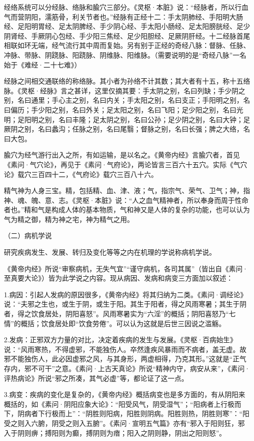 \documentclass[12pt,UTF8]{ctexbook}
\begin{document}
经络系统可以分经脉、络脉和腧穴三部分。《灵枢·本脏》说：“经脉者，所以行血气而营阴阳，濡筋骨，利关节者也。”经脉有正经十二：手太阴肺经、手阳明大肠经、足阳明胃经、足太阴脾经、手少阴心经、手太阳小肠经、足太阳膀胱经、足少阴肾经、手厥阴心包经、手少阳三焦经、足少阳胆经、足厥阴肝经。十二经脉首尾相联如环无端，经气流行其中周而复始。另有别于正经的奇经八脉：督脉、任脉、冲脉、带脉、阴跷脉、阳跷脉、阴维脉、阳维脉。（需要说明的是“奇经八脉”一名始于《难经·二十七难》）

经脉之间相交通联络的称络脉。其小者为孙络不计其数；其大者有十五，称十五络脉。《灵枢·经脉》言之甚详，这里仅摘其要：手太阴之别，名曰列缺；手少阴之别，名曰通里；手心主之别，名曰内关；手太阳之别，名曰支正；手阳明之别，名曰偏历；手少阳之别，名曰外关；足太阳之别，名曰飞阳；足少阳之别，名曰光明；足阳明之别，名曰丰隆；足太阴之别，名曰公孙；足少阴之别，名曰大钟；足厥阴之别，名曰蠡沟；任脉之别，名曰尾翳；督脉之别，名曰长强；脾之大络，名曰大包。

腧穴为经气游行出入之所，有如运输，是以名之。《黄帝内经》言腧穴者，首见《素问·气穴论》，再见于《素问·气府论》，两论皆言三百六十五穴。实际《气穴论》载穴三百四十二，《气府论》载穴三百八十六。

精气神为人身三宝。精，包括精、血、津、液；气，指宗气、荣气、卫气；神，指神、魂、魄、意、志。《灵枢·本脏》说：“人之血气精神者，所以奉身而周于性命者也。”精和气是构成人体的基本物质，气和神又是人体的复杂的功能，也可以认为气为精之御，精为神之宅，神为精气之用。

（二）病机学说

研究疾病发生、发展、转归及变化等等之内在机理的学说称病机学说。

《黄帝内经》所说“审察病机，无失气宜”“谨守病机，各司其属”（皆出自《素问·至真要大论》）皆为此学说之内容。现从病因、发病和病变三方面加以叙述：

1.病因：引起人发病的原因很多，《黄帝内经》将其归纳为二类。《素问·调经论》说：“夫邪之生也，或生于阴，或生于阳。其生于阳者，得之风雨寒暑；其生于阴者，得之饮食居处，阴阳喜怒”。风雨寒暑实为“六淫”的概括；阴阳喜怒乃“七情”的概括；饮食居处即“饮食劳倦”。可以认为这就是后世三因说之滥觞。

2.发病：正邪双方力量的对比，决定着疾病的发生与发展。《灵枢·百病始生》说：“风雨寒热，不得虚邪，不能独伤人。卒然逢疾风暴雨而不病者，盖无虚。故邪不能独伤人，此必因虚邪之风，与其身形，两虚相得，乃克其形。”这就是“正气存内，邪不可干”之意。《素问·上古天真论》所说“精神内守，病安从来”，《素问·评热病论》所说“邪之所凑，其气必虚”等，都论证了这一点。

3.病变：疾病的变化是复杂的，《黄帝内经》概括病变也是多方面的，有从阴阳来概括的，如《素问·阴阳应象大论》：“阳受风气，阴受湿气”；“阳病者上行极而下，阴病者下行极而上”：“阴胜则阳病，阳胜则阴病。阳胜则热，阴胜则寒”：“阳受之则入六腑，阴受之则入五腑”。《素问·宣明五气篇》亦有“邪入于阳则狂，邪入于阴则痹；搏阳则为癫，搏阴则为瘖；阳入之阴则静，阴出之阳则怒”。
\end{document}
